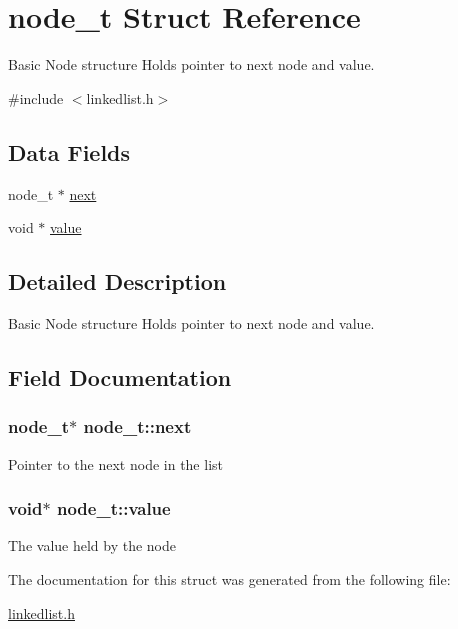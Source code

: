 \hypertarget{structnode}{\section{node\+\_\+t Struct Reference}
\label{structnode}
}


Basic Node structure Holds pointer to next node and value.  




{\ttfamily \#include $<$linkedlist.\+h$>$}

\subsection*{Data Fields}
\begin{DoxyCompactItemize}
\item 
node\+\_\+t $\ast$ \hyperlink{structnode_a3eaaa938f4adef906b28c0afcaf511d6}{next}
\item 
void $\ast$ \hyperlink{structnode_aaf8a798f9224379b485c34f7e0fab66b}{value}
\end{DoxyCompactItemize}


\subsection{Detailed Description}
Basic Node structure Holds pointer to next node and value. 

\subsection{Field Documentation}
\hypertarget{structnode_a3eaaa938f4adef906b28c0afcaf511d6}{
\subsubsection[{next}]{\setlength{\rightskip}{0pt plus 5cm}node\+\_\+t$\ast$ node\+\_\+t\+::next}}\label{structnode_a3eaaa938f4adef906b28c0afcaf511d6}
Pointer to the next node in the list \hypertarget{structnode_aaf8a798f9224379b485c34f7e0fab66b}{
\subsubsection[{value}]{\setlength{\rightskip}{0pt plus 5cm}void$\ast$ node\+\_\+t\+::value}}\label{structnode_aaf8a798f9224379b485c34f7e0fab66b}
The value held by the node 

The documentation for this struct was generated from the following file\+:\begin{DoxyCompactItemize}
\item 
\hyperlink{linkedlist_8h}{linkedlist.\+h}\end{DoxyCompactItemize}
